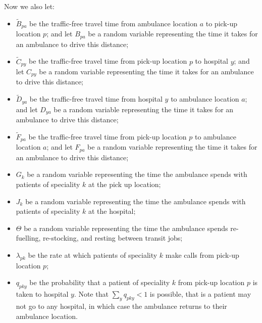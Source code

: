 \documentclass[preprint,12pt]{elsarticle}
\begin{document}
Now we also let:
\begin{itemize}
  \item $\tilde{B}_{pa}$ be the traffic-free travel time from ambulance location
        $a$ to pick-up location $p$; and let $B_{pa}$ be a random variable
        representing the time it takes for an ambulance to drive this distance;
  \item $\tilde{C}_{py}$ be the traffic-free travel time from pick-up location
        $p$ to hospital $y$; and let $C_{py}$ be a random variable representing
        the time it takes for an ambulance to drive this distance;
  \item $\tilde{D}_{ya}$ be the traffic-free travel time from hospital $y$ to
        ambulance location $a$; and let $D_{ya}$ be a random variable
        representing the time it takes for an ambulance to drive this distance;
  \item $\tilde{F}_{pa}$ be the traffic-free travel time from pick-up location
        $p$ to ambulance location $a$; and let $F_{pa}$ be a random variable
        representing the time it takes for an ambulance to drive this distance;
  \item $G_k$ be a random variable representing the time the ambulance spends
        with patients of speciality $k$ at the pick up location;
  \item $J_k$ be a random variable representing the time the ambulance spends
        with patients of speciality $k$ at the hospital;
  \item $\Theta$ be a random variable representing the time the ambulance spends
        re-fuelling, re-stocking, and resting between transit jobs;
  \item $\lambda_{pk}$ be the rate at which patients of speciality $k$ make
        calls from pick-up location $p$;
  \item $q_{pky}$ be the probability that a patient of speciality $k$ from
        pick-up location $p$ is taken to hospital $y$.
        Note that $\sum_y q_{pky} < 1$ is possible, that is a patient may not go
        to any hospital, in which case the ambulance returns to their ambulance
        location.
\end{itemize}
\end{document}
